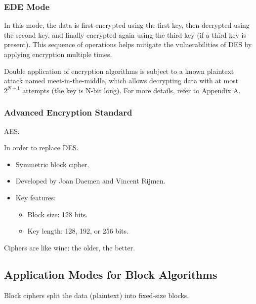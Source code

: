 \subsubsection*{EDE Mode}
In this mode, the data is first encrypted using the first key, then decrypted using the second key, and finally encrypted again using the third key (if a third key is present). This sequence of operations helps mitigate the vulnerabilities of DES by applying encryption multiple times.

\begin{tcolorbox}[colback=blue!10!white, colframe=blue!50!white, title=Meet-in-the-Middle attack]
    Double application of encryption algorithms is subject to a known plaintext attack named meet-in-the-middle, which allows decrypting data with at most $2^{N+1}$ attempts (the key is N-bit long).
    For more details, refer to Appendix A.
\end{tcolorbox}

\subsubsection{Advanced Encryption Standard}
\begin{center}
    AES.
\end{center}
In order to replace DES.

\begin{itemize}
    \item Symmetric block cipher.
    \item Developed by Joan Daemen and Vincent Rijmen.
    \item Key features:
    \begin{itemize}
        \item Block size: 128 bits.
        \item Key length: 128, 192, or 256 bits.
    \end{itemize}
\end{itemize}

\begin{tcolorbox}[colback=blue!10!white, colframe=blue!50!white]
Ciphers are like wine: the older, the better.
\end{tcolorbox}


\subsection{Application Modes for Block Algorithms}
Block ciphers split the data (plaintext) into fixed-size blocks.

